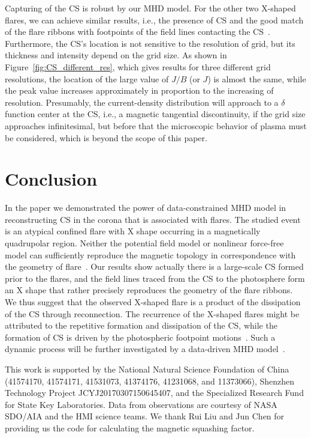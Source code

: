 \documentclass[twocolumn]{aastex6} %
\newcommand{\Fig}{{Figure}}
\begin{document}
\begin{CJK*}{UTF8}{gbsn}
Capturing of the CS is robust by our MHD model. For the other two
X-shaped flares, we can achieve similar results, i.e., the presence of CS and the
good match of the flare ribbons with footpoints of the field lines
contacting the CS~\citep[not shown here, but see
][]{YanX2017inprep}. Furthermore, the CS's location is not
sensitive to the resolution of grid, but its thickness and
intensity depend on the grid size. As shown in \Fig~\ref{fig:CS_different_res}, which gives
results for three different grid resolutions, the location of the
large value of $J/B$ (or $J$) is almost the same, while the peak value
increases approximately in proportion to the increasing of resolution.
Presumably, the current-density distribution
will approach to a $\delta$ function center at the CS, i.e.,
a magnetic tangential discontinuity, if the grid size
approaches infinitesimal, but before that the microscopic
behavior of plasma must be considered, which is beyond the scope of this paper.


\section{Conclusion}

In the paper we demonstrated the power of data-constrained MHD model
in reconstructing CS in the corona that is associated with flares. The
studied event is an atypical confined flare with X shape occurring in a
magnetically quadrupolar region. Neither the potential field model or
nonlinear force-free model can sufficiently reproduce the magnetic
topology in correspondence with the geometry of flare~\citep[see][]{LiuR2016NatSR}.
Our results show actually there is a large-scale CS
formed prior to the flares, and the field lines traced from the CS to
the photosphere form an X shape that rather precisely reproduces the
geometry of the flare ribbons. We thus suggest that the observed
X-shaped flare is a product of the dissipation of the CS through
reconnection. The recurrence of the X-shaped flares {might} be attributed
to the repetitive formation and dissipation of the CS, {while the
formation of CS is driven by the photospheric footpoint motions~\citep{Santos2011}}. Such
a dynamic process will be further investigated by a data-driven MHD
model~\citep[e.g.,][]{Jiang2016NC, Jiang2016ApJ}.



\acknowledgments

This work is supported by the
National Natural Science Foundation of China (41574170, 41574171, 41531073,
41374176,  41231068, and 11373066), Shenzhen Technology Project JCYJ20170307150645407,
and the Specialized Research Fund for State Key Laboratories.
Data from observations are courtesy of NASA {SDO}/AIA and the HMI science teams.
We thank Rui Liu and Jun Chen for providing us the code for calculating the magnetic
squashing factor.


\end{CJK*}
\end{document}
